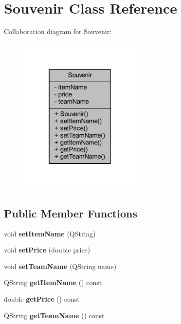 \hypertarget{class_souvenir}{}\section{Souvenir Class Reference}
\label{class_souvenir}


Collaboration diagram for Souvenir\+:
\nopagebreak
\begin{figure}[H]
\begin{center}
\leavevmode
\includegraphics[width=175pt]{class_souvenir__coll__graph}
\end{center}
\end{figure}
\subsection*{Public Member Functions}
\begin{DoxyCompactItemize}
\item 
\mbox{\label{class_souvenir_a968ad05d980d8284b891d760b4338553}} 
void {\bfseries set\+Item\+Name} (Q\+String)
\item 
\mbox{\label{class_souvenir_a3664ce2aa3d258e6bf21e2f0f3741efe}} 
void {\bfseries set\+Price} (double price)
\item 
\mbox{\label{class_souvenir_aadd5431a88f683445ce407cbfd4b0390}} 
void {\bfseries set\+Team\+Name} (Q\+String name)
\item 
\mbox{\label{class_souvenir_a0b74aa98dac5f6d6b2541752ec431a82}} 
Q\+String {\bfseries get\+Item\+Name} () const
\item 
\mbox{\label{class_souvenir_aa3dfe5b64bfc5e3785cefd90759e281f}} 
double {\bfseries get\+Price} () const
\item 
\mbox{\label{class_souvenir_ab52b658cab6e30ca568a70df08797d8c}} 
Q\+String {\bfseries get\+Team\+Name} () const
\end{DoxyCompactItemize}
